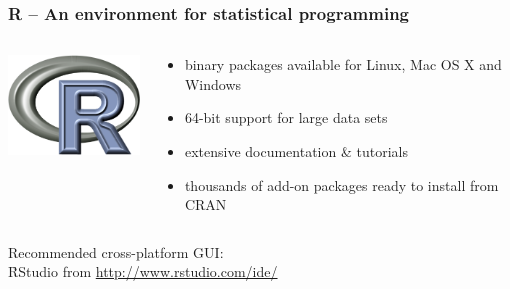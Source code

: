 \documentclass[t]{beamer} %
\begin{document}
\begin{frame}
  \frametitle{\textbf{R} -- An environment for statistical programming}
  
  \vspace{5mm}
  \begin{columns}[c]
    \begin{column}{35mm}
      \includegraphics[width=4cm]{img/Rlogo}
    \end{column}
    \begin{column}{7cm}
      \begin{itemize}
      \item binary packages available for Linux, Mac OS X and Windows
      \item 64-bit support for large data sets
      \item extensive documentation \& tutorials
      \item thousands of add-on packages ready to install from CRAN
      \end{itemize}
    \end{column}
  \end{columns}
  \vspace{8mm}
  \begin{center}
    
    \vspace{6mm}
    Recommended cross-platform GUI:\\
    \h{RStudio} from \url{http://www.rstudio.com/ide/}
  \end{center}
\end{frame}
\end{document}
